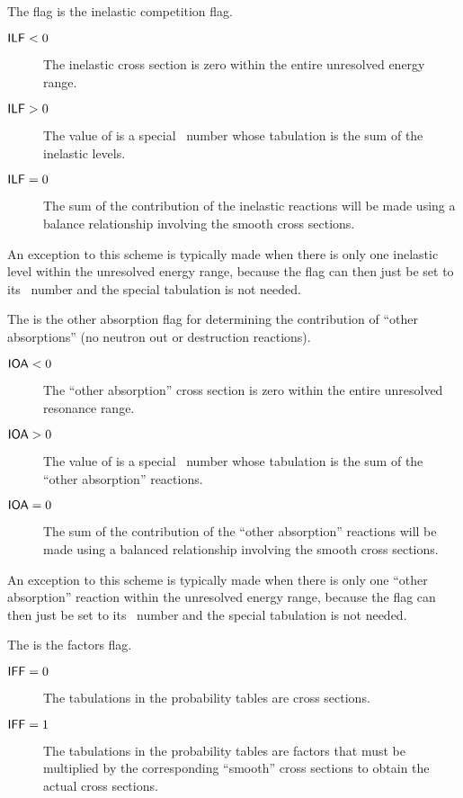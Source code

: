 \begin{description}[labelindent=1em]
  \item[\var{ILF}] The  flag is the inelastic competition flag.%
    \begin{description}
      \item[$\textsf{ILF}<0$] The inelastic cross section is zero within the entire unresolved energy range.
      \item[$\textsf{ILF}>0$] The value of  is a special \MT\ number whose tabulation is the sum of the inelastic levels. 
      \item[$\textsf{ILF}=0$] The sum of the contribution of the inelastic reactions will be made using a balance relationship involving the smooth cross sections.
    \end{description}
    An exception to this scheme is typically made when there is only one inelastic level within the unresolved energy range, because the flag can then just be set to its \MT\ number and the special tabulation is not needed.
  \item[\var{IOA}] The  is the other absorption flag for determining the contribution of ``other absorptions'' (no neutron out or destruction reactions).
    \begin{description}
      \item[$\textsf{IOA}<0$] The ``other absorption'' cross section is zero within the entire unresolved resonance range. 
      \item[$\textsf{IOA}>0$] The value of  is a special \MT\ number whose tabulation is the sum of the ``other absorption'' reactions. 
      \item[$\textsf{IOA}=0$] The sum of the contribution of the ``other absorption'' reactions will be made using a balanced relationship involving the smooth cross sections.
    \end{description}
    An exception to this scheme is typically made when there is only one ``other absorption'' reaction within the unresolved energy range, because the flag can then just be set to its \MT\ number and the special tabulation is not needed. 
  \item[\var{IFF}] The  is the factors flag.
    \begin{description}
      \item[$\textsf{IFF}=0$] The tabulations in the probability tables are cross sections.
      \item[$\textsf{IFF}=1$] The tabulations in the probability tables are factors that must be multiplied by the corresponding ``smooth'' cross sections to obtain the actual cross sections.
    \end{description}
\end{description}

